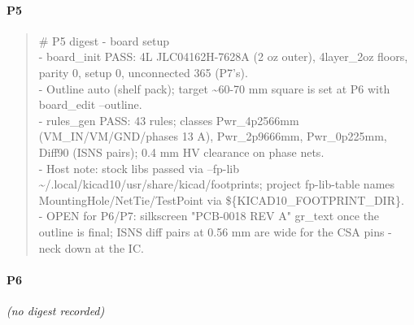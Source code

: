 \documentclass[11pt,a4paper]{article}
\begin{document}
\paragraph*{P5}
\begin{quote}\small\ttfamily\raggedright
\# P5 digest - board setup\\
- board\_init PASS: 4L JLC04162H-7628A (2 oz outer), 4layer\_2oz floors, parity 0, setup 0, unconnected 365 (P7's).\\
- Outline auto (shelf pack); target \textasciitilde{}60-70 mm square is set at P6 with board\_edit --outline.\\
- rules\_gen PASS: 43 rules; classes Pwr\_4p2566mm (VM\_IN/VM/GND/phases 13 A), Pwr\_2p9666mm, Pwr\_0p225mm, Diff90 (ISNS pairs); 0.4 mm HV clearance on phase nets.\\
- Host note: stock libs passed via --fp-lib \textasciitilde{}/.local/kicad10/usr/share/kicad/footprints; project fp-lib-table names MountingHole/NetTie/TestPoint via \$\{KICAD10\_FOOTPRINT\_DIR\}.\\
- OPEN for P6/P7: silkscreen "PCB-0018 REV A" gr\_text once the outline is final; ISNS diff pairs at 0.56 mm are wide for the CSA pins - neck down at the IC.
\end{quote}
\paragraph*{P6}
\emph{(no digest recorded)}
\end{document}
